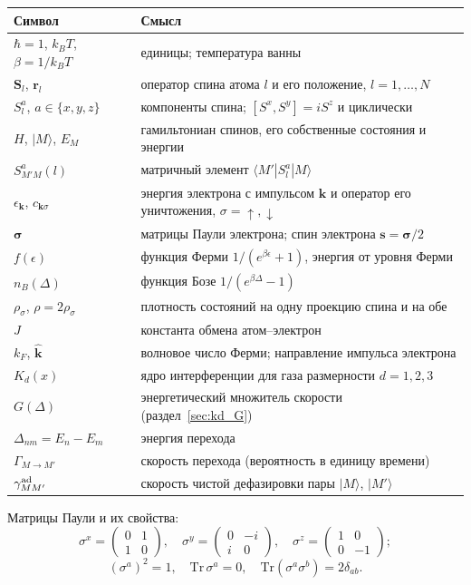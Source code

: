 \begin{center}\small
\begin{tabular}{p{2.6cm}p{11.4cm}}
\toprule
Символ & Смысл \\
\midrule
$\hbar=1$, $k_BT$, $\beta=1/k_BT$ & единицы; температура ванны \\
$\mathbf S_l$, $\mathbf r_l$ & оператор спина атома $l$ и его положение, $l=1,\dots,N$ \\
$S^a_l$, $a\in\{x,y,z\}$ & компоненты спина; $[S^x,S^y]=iS^z$ и циклически \\
$H$, $|M\rangle$, $E_M$ & гамильтониан спинов, его собственные состояния и энергии \\
$S^a_{M'M}(l)$ & матричный элемент $\langle M'|S^a_l|M\rangle$ \\
$\epsilon_{\mathbf k}$, $c_{\mathbf k\sigma}$ & энергия электрона с импульсом $\mathbf k$ и оператор его уничтожения, $\sigma=\uparrow,\downarrow$ \\
$\boldsymbol\sigma$ & матрицы Паули электрона; спин электрона $\mathbf s=\boldsymbol\sigma/2$ \\
$f(\epsilon)$ & функция Ферми $1/(e^{\beta\epsilon}+1)$, энергия от уровня Ферми \\
$n_B(\Delta)$ & функция Бозе $1/(e^{\beta\Delta}-1)$ \\
$\rho_\sigma$, $\rho=2\rho_\sigma$ & плотность состояний на одну проекцию спина и на обе \\
$J$ & константа обмена атом--электрон \\
$k_F$, $\hat{\mathbf k}$ & волновое число Ферми; направление импульса электрона \\
$K_d(x)$ & ядро интерференции для газа размерности $d=1,2,3$ \\
$G(\Delta)$ & энергетический множитель скорости (раздел~\ref{sec:kd_G}) \\
$\Delta_{nm}=E_n-E_m$ & энергия перехода \\
$\Gamma_{M\to M'}$ & скорость перехода (вероятность в единицу времени) \\
$\gamma^{\rm ad}_{MM'}$ & скорость чистой дефазировки пары $|M\rangle$, $|M'\rangle$ \\
\bottomrule
\end{tabular}
\end{center}

Матрицы Паули и их свойства:
\[
\sigma^x=\begin{pmatrix}0&1\\1&0\end{pmatrix},\quad
\sigma^y=\begin{pmatrix}0&-i\\i&0\end{pmatrix},\quad
\sigma^z=\begin{pmatrix}1&0\\0&-1\end{pmatrix};
\]
\[
(\sigma^a)^2=1,\quad \mathrm{Tr}\,\sigma^a=0,\quad
\mathrm{Tr}(\sigma^a\sigma^b)=2\delta_{ab}.
\]

